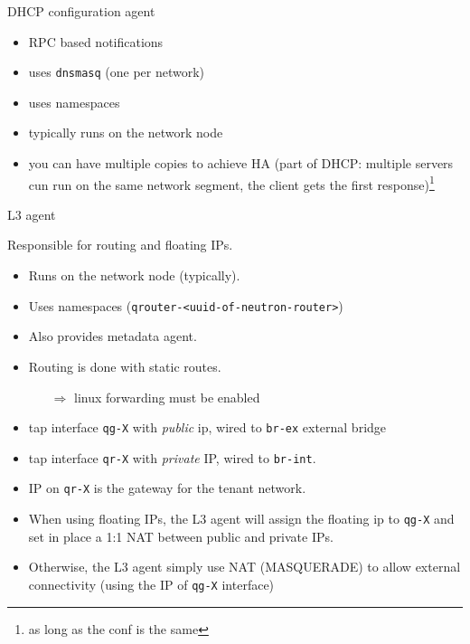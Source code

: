 \documentclass[english,serif,mathserif,xcolor=pdftex,dvipsnames,table]{beamer}
\begin{document}
\begin{frame}
  {DHCP configuration agent}
  \begin{itemize}
  \item RPC based notifications
  \item uses \texttt{dnsmasq} (one per network)
  \item uses namespaces
  \item typically runs on the network node
  \item you can have multiple copies to achieve HA (part of DHCP:
    multiple servers cun run on the same network segment, the client
    gets the first response)\footnote{as long as the conf is the same}
  \end{itemize}
\end{frame}

\begin{frame}
  {L3 agent}

  Responsible for routing and floating IPs.

\scriptsize  \begin{itemize}
  \item Runs on the network node (typically).

  \item Uses namespaces (\texttt{qrouter-<uuid-of-neutron-router>})

  \item Also provides metadata agent.

  \item Routing is done with static routes.
    \begin{itemize}\scriptsize
    \item[$\Rightarrow$] linux forwarding must be enabled
    \end{itemize}
  \item tap interface \texttt{qg-X} with \textit{public} ip, wired to
    \texttt{br-ex} external bridge

  \item tap interface \texttt{qr-X} with \textit{private} IP, wired to
    \texttt{br-int}.

  \item IP on \texttt{qr-X} is the gateway for the tenant network.

  \item When using floating IPs, the L3 agent will assign the floating
    ip to \texttt{qg-X} and set in place a 1:1 NAT between public and
    private IPs.

  \item Otherwise, the L3 agent simply use NAT (MASQUERADE) to allow
    external connectivity (using the IP of \texttt{qg-X} interface)
  \end{itemize}
\end{frame}
\end{document}
